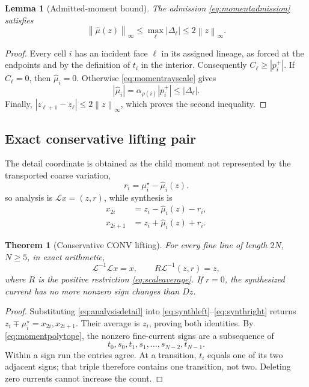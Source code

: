 \documentclass[journal]{IEEEtran}
\newtheorem{theorem}{Theorem}
\newtheorem{lemma}{Lemma}
\newcommand{\norm}[1]{\left\lVert#1\right\rVert}
\begin{document}
\begin{lemma}[Admitted-moment bound]
The admission \eqref{eq:momentadmission} satisfies
\begin{equation}
 \norm{\widehat\mu(z)}_\infty\leq
 \max_\ell|\Delta_\ell|\leq2\norm z_\infty.
 \label{eq:admittedmomentbound}
\end{equation}
\end{lemma}

\begin{proof}
Every cell \(i\) has an incident face \(\ell\) in its assigned lineage, as
forced at the endpoints and by the definition of \(t_i\) in the interior.
Consequently \(C_\ell\geq|p_i^+|\). If \(C_\ell=0\), then
\(\widehat\mu_i=0\). Otherwise
\eqref{eq:momentrayscale} gives
\[
 |\widehat\mu_i|
 =\alpha_{\rho(i)}|p_i^+|
 \leq|\Delta_\ell|.
\]
Finally, \(|z_{\ell+1}-z_\ell|\leq2\norm z_\infty\), which proves the second
inequality.
\end{proof}

\subsection{Exact conservative lifting pair}

The detail coordinate is obtained as the child moment not represented by the
transported coarse variation,
\begin{equation}
 r_i=\mu_i^\star-\widehat\mu_i(z).
 \label{eq:analysisdetail}
\end{equation}
so analysis is \(\mathcal Lx=(z,r)\), while synthesis is
\begin{align}
 x_{2i}&=z_i-\widehat\mu_i(z)-r_i,
 \label{eq:synthleft}\\
 x_{2i+1}&=z_i+\widehat\mu_i(z)+r_i.
 \label{eq:synthright}
\end{align}

\begin{theorem}[Conservative CONV lifting]
For every fine line of length \(2N\), \(N\geq5\), in exact arithmetic,
\begin{equation}
 \mathcal L^{-1}\mathcal Lx=x,
 \qquad R\mathcal L^{-1}(z,r)=z,
 \label{eq:fullcycle}
\end{equation}
where \(R\) is the positive restriction \eqref{eq:scaleaverage}. If \(r=0\),
the synthesized current has no more nonzero sign changes than \(Dz\).
\end{theorem}

\begin{proof}
Substituting \eqref{eq:analysisdetail} into
\eqref{eq:synthleft}--\eqref{eq:synthright} returns
\(z_i\mp\mu_i^\star=x_{2i},x_{2i+1}\). Their average is \(z_i\), proving
both identities. By \eqref{eq:momentpolytope}, the nonzero fine-current signs
are a subsequence of
\[
 t_0,s_0,t_1,s_1,\ldots,s_{N-2},t_{N-1}.
\]
Within a sign run the entries agree. At a transition, \(t_i\) equals one of
its two adjacent signs; that triple therefore contains one transition, not
two. Deleting zero currents cannot increase the count.
\end{proof}
\end{document}
